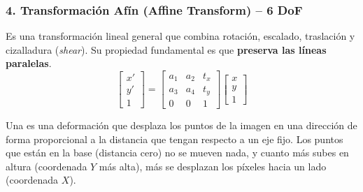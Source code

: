 \subsubsection{4. Transformación Afín (Affine Transform) -- 6 DoF}
\noindent
Es una transformación lineal general que combina rotación, escalado, traslación y cizalladura (\textit{shear}). Su propiedad fundamental es que \textbf{preserva las líneas paralelas}.
$$\begin{bmatrix} x' \\ y' \\ 1 \end{bmatrix} = \begin{bmatrix} a_1 & a_2 & t_x \\ a_3 & a_4 & t_y \\ 0 & 0 & 1 \end{bmatrix} \begin{bmatrix} x \\ y \\ 1 \end{bmatrix}$$

\begin{definicion}
    Una  es una deformación que desplaza los puntos de la imagen en una dirección de forma proporcional a la distancia que tengan respecto a un eje fijo. Los puntos que están en la base (distancia cero) no se mueven nada, y cuanto más subes en altura (coordenada $Y$ más alta), más se desplazan los píxeles hacia un lado (coordenada $X$). \\
\end{definicion}

